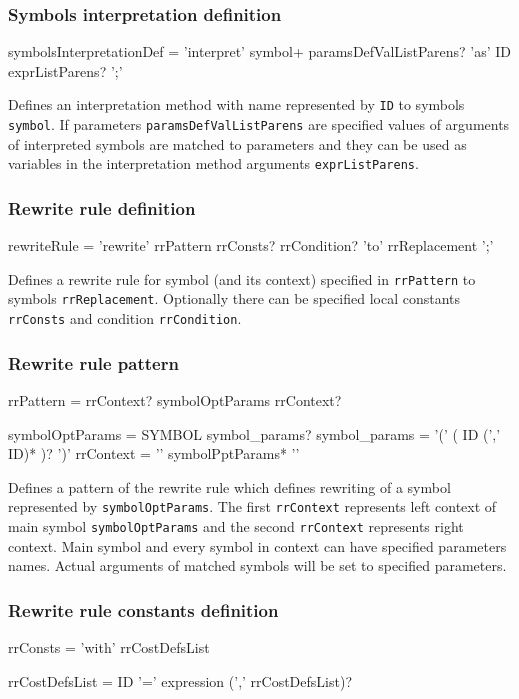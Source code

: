 \subsubsection{Symbols interpretation definition}
\begin{Grammar}
symbolsInterpretationDef = 'interpret'
	symbol+ paramsDefValListParens? 'as' ID exprListParens? ';'
\end{Grammar}

Defines an interpretation method with name represented by \texttt{ID} to symbols \texttt{symbol}.
If parameters \texttt{paramsDefValListParens} are specified values of arguments of interpreted symbols are matched to parameters and they can be used as variables in the interpretation method arguments \texttt{exprListParens}.


\subsubsection{Rewrite rule definition}
\begin{Grammar}
rewriteRule = 'rewrite' rrPattern rrConsts? rrCondition?
	'to' rrReplacement ';'
\end{Grammar}

Defines a rewrite rule for symbol (and its context) specified in \texttt{rrPattern} to symbols \texttt{rrReplacement}.
Optionally there can be specified local constants \texttt{rrConsts} and condition \texttt{rrCondition}.


\subsubsection{Rewrite rule pattern}
\begin{Grammar}
rrPattern = rrContext? symbolOptParams rrContext?

symbolOptParams = SYMBOL symbol_params?
symbol_params = '(' ( ID (',' ID)* )? ')'
rrContext = '{' symbolPptParams* '}'
\end{Grammar}

Defines a pattern of the rewrite rule which defines rewriting of a symbol represented by \texttt{symbolOptParams}.
The first \texttt{rrContext} represents left context of main symbol \texttt{symbolOptParams} and the second \texttt{rrContext} represents right context.
Main symbol and every symbol in context can have specified parameters names.
Actual arguments of matched symbols will be set to specified parameters.


\subsubsection{Rewrite rule constants definition}
\begin{Grammar}
rrConsts = 'with' rrCostDefsList

rrCostDefsList = ID '=' expression  (',' rrCostDefsList)?
\end{Grammar}

